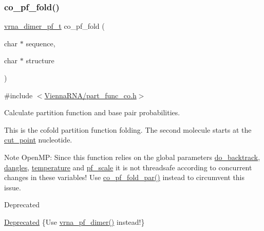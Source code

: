 \subsubsection{\texorpdfstring{co\+\_\+pf\+\_\+fold()}{co\_pf\_fold()}}
{\footnotesize\ttfamily \hyperlink{group__pf__cofold_ga444df1587c9a2ca15b8eb25188f629c3}{vrna\+\_\+dimer\+\_\+pf\+\_\+t} co\+\_\+pf\+\_\+fold (\begin{DoxyParamCaption}\item[{char $\ast$}]{sequence,  }\item[{char $\ast$}]{structure }\end{DoxyParamCaption})}



{\ttfamily \#include $<$\hyperlink{part__func__co_8h}{Vienna\+R\+N\+A/part\+\_\+func\+\_\+co.\+h}$>$}



Calculate partition function and base pair probabilities. 

This is the cofold partition function folding. The second molecule starts at the \hyperlink{fold__vars_8h_ab9b2c3a37a5516614c06d0ab54b97cda}{cut\+\_\+point} nucleotide.

\begin{DoxyNote}{Note}
Open\+MP\+: Since this function relies on the global parameters \hyperlink{group__model__details_gad512b5dd4dbec60faccfe137bb474489}{do\+\_\+backtrack}, \hyperlink{group__model__details_ga72b511ed1201f7e23ec437e468790d74}{dangles}, \hyperlink{group__model__details_gab4b11c8d9c758430960896bc3fe82ead}{temperature} and \hyperlink{group__model__details_gad3b22044065acc6dee0af68931b52cfd}{pf\+\_\+scale} it is not threadsafe according to concurrent changes in these variables! Use \hyperlink{group__part__func__global__deprecated_gaabfc6cb6d02b8f08ac4c92f4f5b125d9}{co\+\_\+pf\+\_\+fold\+\_\+par()} instead to circumvent this issue.
\end{DoxyNote}
\begin{DoxyRefDesc}{Deprecated}
\item[\hyperlink{deprecated__deprecated000110}{Deprecated}]\{Use \hyperlink{group__part__func__global_ga4e5c7d06c302a7c59fc0d64dc142ca63}{vrna\+\_\+pf\+\_\+dimer()} instead!\}\end{DoxyRefDesc}



